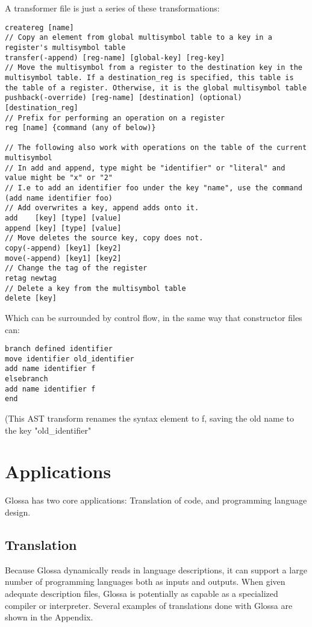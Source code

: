 \documentclass{article}
\begin{document}
A transformer file is just a series of these transformations:
\begin{verbatim}
createreg [name]
// Copy an element from global multisymbol table to a key in a register's multisymbol table
transfer(-append) [reg-name] [global-key] [reg-key] 
// Move the multisymbol from a register to the destination key in the multisymbol table. If a destination_reg is specified, this table is the table of a register. Otherwise, it is the global multisymbol table
pushback(-override) [reg-name] [destination] (optional)[destination_reg]
// Prefix for performing an operation on a register
reg [name] {command (any of below)} 

// The following also work with operations on the table of the current multisymbol
// In add and append, type might be "identifier" or "literal" and value might be "x" or "2"
// I.e to add an identifier foo under the key "name", use the command (add name identifier foo)
// Add overwrites a key, append adds onto it.
add    [key] [type] [value]
append [key] [type] [value]
// Move deletes the source key, copy does not.
copy(-append) [key1] [key2]
move(-append) [key1] [key2]
// Change the tag of the register
retag newtag
// Delete a key from the multisymbol table
delete [key]
\end{verbatim}
Which can be surrounded by control flow, in the same way that constructor files can:
\begin{verbatim}
branch defined identifier 
move identifier old_identifier
add name identifier f
elsebranch
add name identifier f
end
\end{verbatim}
(This AST transform renames the syntax element to f, saving the old name to the key "old\_identifier"

\section{Applications}

Glossa has two core applications: Translation of code, and programming language design.

\subsection{Translation}

Because Glossa dynamically reads in language descriptions, it can support a large number of programming languages both as inputs and outputs.
When given adequate description files, Glossa is potentially as capable as a specialized compiler or interpreter.
Several examples of translations done with Glossa are shown in the Appendix.
\end{document}
